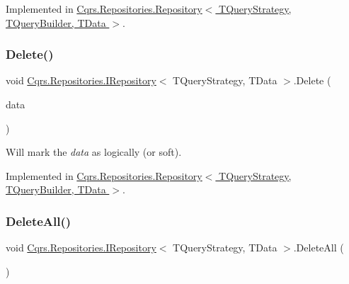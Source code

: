 Implemented in \hyperlink{classCqrs_1_1Repositories_1_1Repository_a2af8103cc2946317f8ee9ede643bbc68}{Cqrs.\+Repositories.\+Repository$<$ T\+Query\+Strategy, T\+Query\+Builder, T\+Data $>$}.

\mbox{\label{interfaceCqrs_1_1Repositories_1_1IRepository_a71c60de3588a757da2d25350c98374fd}} 
\subsubsection{\texorpdfstring{Delete()}{Delete()}}
{\footnotesize\ttfamily void \hyperlink{interfaceCqrs_1_1Repositories_1_1IRepository}{Cqrs.\+Repositories.\+I\+Repository}$<$ T\+Query\+Strategy, T\+Data $>$.Delete (\begin{DoxyParamCaption}\item[{T\+Data}]{data }\end{DoxyParamCaption})}



Will mark the {\itshape data}  as logically (or soft). 



Implemented in \hyperlink{classCqrs_1_1Repositories_1_1Repository_ac9d88baa6afcea85553fd233ba406e48}{Cqrs.\+Repositories.\+Repository$<$ T\+Query\+Strategy, T\+Query\+Builder, T\+Data $>$}.

\mbox{\label{interfaceCqrs_1_1Repositories_1_1IRepository_a0da5f756a0fd184dc51a81741f82734a}} 
\subsubsection{\texorpdfstring{Delete\+All()}{DeleteAll()}}
{\footnotesize\ttfamily void \hyperlink{interfaceCqrs_1_1Repositories_1_1IRepository}{Cqrs.\+Repositories.\+I\+Repository}$<$ T\+Query\+Strategy, T\+Data $>$.Delete\+All (\begin{DoxyParamCaption}{ }\end{DoxyParamCaption})}



